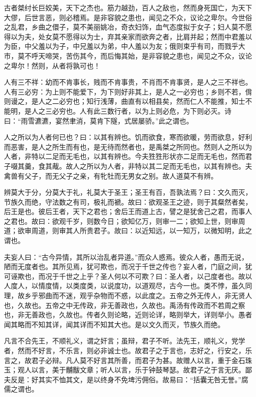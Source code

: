 \documentclass[]{article}
\begin{document}
古者桀纣长巨姣美，天下之杰也。筋力越劲，百人之敌也，然而身死国亡，为天下大僇，后世言恶，则必稽焉。是非容貌之患也，闻见之不众，议论之卑尔。今世俗之乱君，乡曲之儇子，莫不美丽姚冶，奇衣妇饰，血气态度拟于女子；妇人莫不愿得以为夫，处女莫不愿得以为士，弃其亲家而欲奔之者，比肩并起；然而中君羞以为臣，中父羞以为子，中兄羞以为弟，中人羞以为友；俄则束乎有司，而戮乎大市，莫不呼天啼哭，苦伤其今，而后悔其始，是非容貌之患也，闻见之不众，议论之卑尔！然则，从者将孰可也！

人有三不祥：幼而不肯事长，贱而不肯事贵，不肖而不肯事贤，是人之三不祥也。人有三必穷：为上则不能爱下，为下则好非其上，是人之一必穷也；乡则不若，偝则谩之，是人之二必穷也；知行浅薄，曲直有以相县矣，然而仁人不能推，知士不能明，是人之三必穷也。人有此三数行者，以为上则必危，为下则必灭。诗曰：``雨雪瀌瀌，宴然聿消，莫肯下隧，式居屡骄。''此之谓也。

人之所以为人者何已也？曰：以其有辨也。饥而欲食，寒而欲暖，劳而欲息，好利而恶害，是人之所生而有也，是无待而然者也，是禹桀之所同也。然则人之所以为人者，非特以二足而无毛也，以其有辨也。今夫狌狌形状亦二足而无毛也，然而君子啜其羹，食其胾。故人之所以为人者，非特以其二足而无毛也，以其有辨也。夫禽兽有父子，而无父子之亲，有牝牡而无男女之别。故人道莫不有辨。

辨莫大于分，分莫大于礼，礼莫大于圣王；圣王有百，吾孰法焉？曰：文久而灭，节族久而绝，守法数之有司，极礼而褫。故曰：欲观圣王之迹，则于其粲然者矣，后王是也。彼后王者，天下之君也；舍后王而道上古，譬之是犹舍己之君，而事人之君也。故曰：欲观千岁，则数今日；欲知亿万，则审一二；欲知上世，则审周道；欲审周道，则审其人所贵君子。故曰：以近知远，以一知万，以微知明，此之谓也。

夫妄人曰：``古今异情，其所以治乱者异道。''而众人惑焉。彼众人者，愚而无说，陋而无度者也。其所见焉，犹可欺也，而况于千世之传也？妄人者，门庭之间，犹可诬欺也，而况于千世之上乎？圣人何以不可欺？曰：圣人者，以己度者也。故以人度人，以情度情，以类度类，以说度功，以道观尽，古今一也。类不悖，虽久同理，故乡乎邪曲而不迷，观乎杂物而不惑，以此度之。五帝之外无传人，非无贤人也，久故也。五帝之中无传政，非无善政也，久故也。禹汤有传政而不若周之察也，非无善政也，久故也。传者久则论略，近则论详，略则举大，详则举小。愚者闻其略而不知其详，闻其详而不知其大也。是以文久而灭，节族久而绝。

凡言不合先王，不顺礼义，谓之奸言；虽辩，君子不听。法先王，顺礼义，党学者，然而不好言，不乐言，则必非诚士也。故君子之于言也，志好之，行安之，乐言之，故君子必辩。凡人莫不好言其所善，而君子为甚。故赠人以言，重于金石珠玉；观人以言，美于黼黻文章；听人以言，乐于钟鼓琴瑟。故君子之于言无厌。鄙夫反是：好其实不恤其文，是以终身不免埤污佣俗。故易曰：``括囊无咎无誉。''腐儒之谓也。
\end{document}
